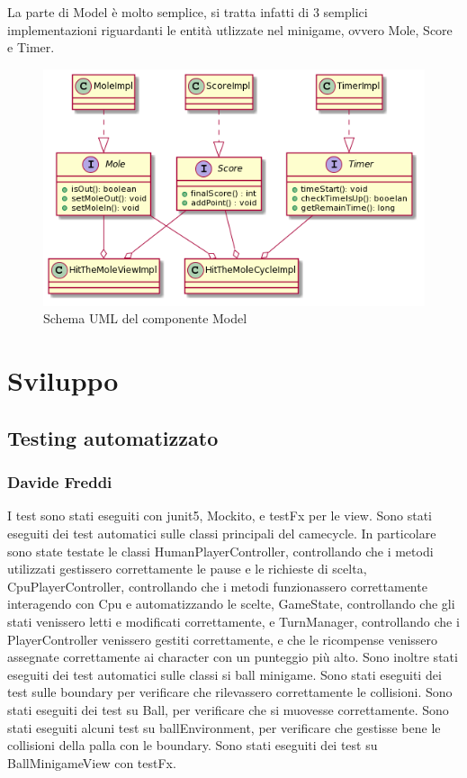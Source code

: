 \documentclass[a4paper,12pt]{report}
\begin{document}
	La parte di Model è molto semplice, si tratta infatti di 3 semplici implementazioni riguardanti le entità utlizzate nel minigame, ovvero Mole, Score e Timer.\newline
    \begin{figure}[!t]
        \centering{}
        \includegraphics[width=150mm]{images/squarcialupi/molegame-modelPart.png}
        \caption{Schema UML del componente Model}
        \label{img:molegame-modelPart}
    \end{figure}
    

	\chapter{Sviluppo}
	\section{Testing automatizzato}

	\subsection{Davide Freddi}
	I test sono stati eseguiti con junit5, Mockito, e testFx per le view.
    Sono stati eseguiti dei test automatici sulle classi principali del camecycle.
    In particolare sono state testate le classi HumanPlayerController, controllando che i metodi utilizzati gestissero correttamente le pause e le richieste di scelta, CpuPlayerController, controllando che i metodi funzionassero correttamente interagendo con Cpu e automatizzando le scelte, GameState, controllando che gli stati venissero letti e modificati correttamente, e TurnManager, controllando che i PlayerController venissero gestiti correttamente, e che le ricompense venissero assegnate correttamente ai character con un punteggio più alto.
    Sono inoltre stati eseguiti dei test automatici sulle classi si ball minigame.
    Sono stati eseguiti dei test sulle boundary per verificare che rilevassero correttamente le collisioni.
    Sono stati eseguiti dei test su Ball, per verificare che si muovesse correttamente.
    Sono stati eseguiti alcuni test su ballEnvironment, per verificare che gestisse bene le collisioni della palla con le boundary.
    Sono stati eseguiti dei test su BallMinigameView con testFx.
\end{document}
